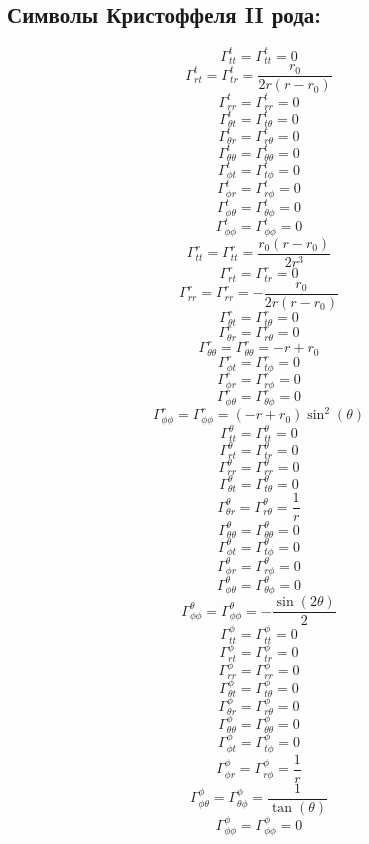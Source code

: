 \documentclass[a4paper, 10pt]{article}
\begin{document}
\subsection{Символы Кристоффеля II рода:}
$$\Gamma^{t}_{t t} = \Gamma^{t}_{t t} = 0$$
$$\Gamma^{t}_{r t} = \Gamma^{t}_{t r} = \frac{r_{0}}{2 r \left(r - r_{0}\right)}$$
$$\Gamma^{t}_{r r} = \Gamma^{t}_{r r} = 0$$
$$\Gamma^{t}_{\theta t} = \Gamma^{t}_{t \theta} = 0$$
$$\Gamma^{t}_{\theta r} = \Gamma^{t}_{r \theta} = 0$$
$$\Gamma^{t}_{\theta \theta} = \Gamma^{t}_{\theta \theta} = 0$$
$$\Gamma^{t}_{\phi t} = \Gamma^{t}_{t \phi} = 0$$
$$\Gamma^{t}_{\phi r} = \Gamma^{t}_{r \phi} = 0$$
$$\Gamma^{t}_{\phi \theta} = \Gamma^{t}_{\theta \phi} = 0$$
$$\Gamma^{t}_{\phi \phi} = \Gamma^{t}_{\phi \phi} = 0$$
$$\Gamma^{r}_{t t} = \Gamma^{r}_{t t} = \frac{r_{0} \left(r - r_{0}\right)}{2 r^{3}}$$
$$\Gamma^{r}_{r t} = \Gamma^{r}_{t r} = 0$$
$$\Gamma^{r}_{r r} = \Gamma^{r}_{r r} = - \frac{r_{0}}{2 r \left(r - r_{0}\right)}$$
$$\Gamma^{r}_{\theta t} = \Gamma^{r}_{t \theta} = 0$$
$$\Gamma^{r}_{\theta r} = \Gamma^{r}_{r \theta} = 0$$
$$\Gamma^{r}_{\theta \theta} = \Gamma^{r}_{\theta \theta} = - r + r_{0}$$
$$\Gamma^{r}_{\phi t} = \Gamma^{r}_{t \phi} = 0$$
$$\Gamma^{r}_{\phi r} = \Gamma^{r}_{r \phi} = 0$$
$$\Gamma^{r}_{\phi \theta} = \Gamma^{r}_{\theta \phi} = 0$$
$$\Gamma^{r}_{\phi \phi} = \Gamma^{r}_{\phi \phi} = \left(- r + r_{0}\right) \sin^{2}{\left(\theta \right)}$$
$$\Gamma^{\theta}_{t t} = \Gamma^{\theta}_{t t} = 0$$
$$\Gamma^{\theta}_{r t} = \Gamma^{\theta}_{t r} = 0$$
$$\Gamma^{\theta}_{r r} = \Gamma^{\theta}_{r r} = 0$$
$$\Gamma^{\theta}_{\theta t} = \Gamma^{\theta}_{t \theta} = 0$$
$$\Gamma^{\theta}_{\theta r} = \Gamma^{\theta}_{r \theta} = \frac{1}{r}$$
$$\Gamma^{\theta}_{\theta \theta} = \Gamma^{\theta}_{\theta \theta} = 0$$
$$\Gamma^{\theta}_{\phi t} = \Gamma^{\theta}_{t \phi} = 0$$
$$\Gamma^{\theta}_{\phi r} = \Gamma^{\theta}_{r \phi} = 0$$
$$\Gamma^{\theta}_{\phi \theta} = \Gamma^{\theta}_{\theta \phi} = 0$$
$$\Gamma^{\theta}_{\phi \phi} = \Gamma^{\theta}_{\phi \phi} = - \frac{\sin{\left(2 \theta \right)}}{2}$$
$$\Gamma^{\phi}_{t t} = \Gamma^{\phi}_{t t} = 0$$
$$\Gamma^{\phi}_{r t} = \Gamma^{\phi}_{t r} = 0$$
$$\Gamma^{\phi}_{r r} = \Gamma^{\phi}_{r r} = 0$$
$$\Gamma^{\phi}_{\theta t} = \Gamma^{\phi}_{t \theta} = 0$$
$$\Gamma^{\phi}_{\theta r} = \Gamma^{\phi}_{r \theta} = 0$$
$$\Gamma^{\phi}_{\theta \theta} = \Gamma^{\phi}_{\theta \theta} = 0$$
$$\Gamma^{\phi}_{\phi t} = \Gamma^{\phi}_{t \phi} = 0$$
$$\Gamma^{\phi}_{\phi r} = \Gamma^{\phi}_{r \phi} = \frac{1}{r}$$
$$\Gamma^{\phi}_{\phi \theta} = \Gamma^{\phi}_{\theta \phi} = \frac{1}{\tan{\left(\theta \right)}}$$
$$\Gamma^{\phi}_{\phi \phi} = \Gamma^{\phi}_{\phi \phi} = 0$$
\end{document}
